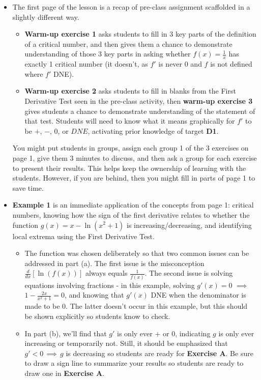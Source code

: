 \documentclass[10pt]{article}
\begin{document}
\hand
\begin{itemize}
\item The first page of the lesson is a recap of pre-class assignment scaffolded in a slightly different way.
    \begin{itemize}
    \item {\bf\color{blue}Warm-up exercise 1} asks students to fill in 3 key parts of the definition of a critical number, and then gives them a chance to demonstrate understanding of those 3 key parts in asking whether $f(x)=\frac1x$ has exactly 1 critical number (it doesn't, as $f'$ is never 0 and $f$ is not defined where $f'$ DNE).
    \item {\bf\color{blue}Warm-up exercise 2} asks students to fill in blanks from the First Derivative Test seen in the pre-class activity, then {\bf\color{blue} warm-up exercise 3} gives students a chance to demonstrate understanding of the statement of that test. Students will need to know what it means graphically for $f'$ to be $+$, $-$, $0$, or $DNE$, activating prior knowledge of target {\bf\color{ForestGreen} D1}.
    \end{itemize}
You might put students in groups, assign each group 1 of the 3 exercises on page 1, give them 3 minutes to discuss, and then ask a group for each exercise to present their results. This helps keep the ownership of learning with the students. However, if you are behind, then you might fill in parts of page 1 to save time.
\item {\bf\color{blue}Example 1} is an immediate application of the concepts from page 1: critical numbers, knowing how the sign of the first derivative relates to whether the function $g(x)=x-\ln(x^2+1)$ is increasing/decreasing, and identifying local extrema using the First Derivative Test.
    \begin{itemize}
    \item The function was chosen deliberately so that two common issues can be addressed in part (a). The first issue is the misconception $\frac{d}{dx}[\ln(f(x))]$ always equals $\frac{1}{f(x)}$. The second issue is solving equations involving fractions - in this example, solving $g'(x)=0$ $\implies$ $1-\frac{2x}{x^2+1}=0$, and knowing that $g'(x)$ DNE when the denominator is made to be $0$. The latter doesn't occur in this example, but this should be shown explicitly so students know to check.
    \item In part (b), we'll find that $g'$ is only ever $+$ or $0$, indicating $g$ is only ever increasing or temporarily not. Still, it should be emphasized that $g'<0 \,\implies\, g$ is decreasing so students are ready for {\bf\color{blue}Exercise A}. Be sure to draw a sign line to summarize your results so students are ready to draw one in {\bf\color{blue} Exercise A}.

\end{itemize}
\end{itemize}
\end{document}
